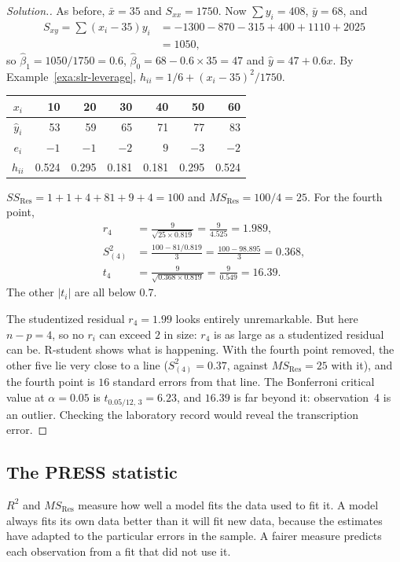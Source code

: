 \documentclass[11pt,a4paper]{article}
\numberwithin{equation}{section}
\theoremstyle{definition}
\newenvironment{solution}
  {\renewcommand{\qedsymbol}{}\begin{proof}[\textit{Solution}.]}
  {\end{proof}}
\begin{document}
\begin{solution}
As before, $\bar x = 35$ and $S_{xx} = 1750$. Now $\sum y_i = 408$, $\bar y = 68$, and
\begin{align*}
S_{xy} = \sum(x_i - 35)y_i &= -1300 - 870 - 315 + 400 + 1110 + 2025 \\
&= 1050 ,
\end{align*}
so $\hat\beta_1 = 1050/1750 = 0.6$, $\hat\beta_0 = 68 - 0.6 \times 35 = 47$ and
$\hat y = 47 + 0.6x$. By Example~\ref{exa:slr-leverage},
$h_{ii} = 1/6 + (x_i - 35)^2/1750$.
\begin{center}
\begin{tabular}{c|rrrrrr}
$x_i$ & 10 & 20 & 30 & 40 & 50 & 60 \\
\hline
$\hat y_i$ & 53 & 59 & 65 & 71 & 77 & 83 \\
$e_i$ & $-1$ & $-1$ & $-2$ & $9$ & $-3$ & $-2$ \\
$h_{ii}$ & 0.524 & 0.295 & 0.181 & 0.181 & 0.295 & 0.524 \\
\end{tabular}
\end{center}
$SS_{\mathrm{Res}} = 1 + 1 + 4 + 81 + 9 + 4 = 100$ and $MS_{\mathrm{Res}} = 100/4 = 25$. For the
fourth point,
\begin{align*}
r_4 &= \frac{9}{\sqrt{25 \times 0.819}} = \frac{9}{4.525} = 1.989, \\
S^2_{(4)} &= \frac{100 - 81/0.819}{3} = \frac{100 - 98.895}{3} = 0.368, \\
t_4 &= \frac{9}{\sqrt{0.368 \times 0.819}} = \frac{9}{0.549} = 16.39 .
\end{align*}
The other $|t_i|$ are all below $0.7$.

The studentized residual $r_4 = 1.99$ looks entirely unremarkable. But here $n - p = 4$,
so no $r_i$ can exceed $2$ in size: $r_4$ is as large as a studentized residual can be.
R-student shows what is happening. With the fourth point removed, the other five lie very
close to a line ($S^2_{(4)} = 0.37$, against $MS_{\mathrm{Res}} = 25$ with it), and the
fourth point is $16$ standard errors from that line. The Bonferroni critical value at
$\alpha = 0.05$ is $t_{0.05/12,\,3} = 6.23$, and $16.39$ is far beyond it: observation~4 is
an outlier. Checking the laboratory record would reveal the transcription error.
\end{solution}

\subsection{The PRESS statistic}
$R^2$ and $MS_{\mathrm{Res}}$ measure how well a model fits the data used to fit it. A model
always fits its own data better than it will fit new data, because the estimates have
adapted to the particular errors in the sample. A fairer measure predicts each observation
from a fit that did not use it.
\end{document}
